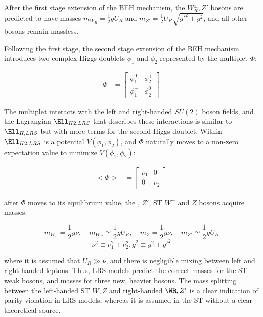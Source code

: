 After the first stage extension of the BEH mechanism, the $W^{\pm}_{R}, Z'$ bosons are predicted to have masses 
$m_{W_{R}} = \frac{1}{2}gU_{R}$ and $m_{Z'} = \frac{1}{2}U_{R}\sqrt{g'^{2} + g^{2}}$, and all other bosons remain 
massless.

Following the first stage, the second stage extension of the BEH mechanism \cite{lrsHiggsStageOne,lrsHiggsStageTwo} 
introduces two complex Higgs doublets $\phi_{1}$ and $\phi_{2}$ represented by the multiplet $\Phi$:

\begin{align}
	\Phi &= \begin{bmatrix}
	\phi^{0}_{1} & \phi^{+}_{2} \\
	\phi^{-}_{1} & \phi^{0}_{2}
	\end{bmatrix}
\end{align}

The multiplet interacts with the left and right-handed $SU(2)$ boson fields, and the Lagrangian $\Ell_{H2,LRS}$ that 
describes these interactions is similar to $\Ell_{H,LRS}$ but with more terms for the second Higgs doublet.  Within 
$\Ell_{H2,LRS}$ is a potential $V(\phi_{1},\phi_{2})$, and $\Phi$ naturally moves to a non-zero expectation 
value to minimize $V(\phi_{1},\phi_{2})$:

\begin{align}
	<\Phi> &= \begin{bmatrix}
	\nu_{1} & 0 \\
	0 & \nu_{2}
	\end{bmatrix}
	\label{eq:stageTwoVEV}
\end{align}

after $\Phi$ moves to its equilibrium value, the \WR, $Z'$, ST $W^{\pm}$ and $Z$ bosons acquire masses:

\begin{equation}
	m_{W_{L}} = \frac{1}{2}g\nu ,\quad m_{W_{R}} \simeq \frac{1}{2}gU_{R} ,\quad m_{Z} = \frac{1}{2}\bar{g}\nu ,\quad m_{Z'} \simeq \frac{1}{2}\bar{g}U_{R}
\end{equation}
\begin{equation}
	\nu^{2} \equiv \nu^{2}_{1} + \nu^{2}_{2} , \bar{g}^{2} \equiv g^{2} + g'^{2}
\end{equation}

where it is assumed that $U_{R} \gg \nu$, and there is negligible mixing between left and right-handed leptons.  
Thus, LRS models predict the correct masses for the ST weak bosons, and masses for three new, heavier bosons.  
The mass splitting between the left-handed ST $W,Z$ and right-handed $\WR,Z'$ is a clear indication of parity 
violation in LRS models, whereas it is assumed in the ST without a clear theoretical source.

